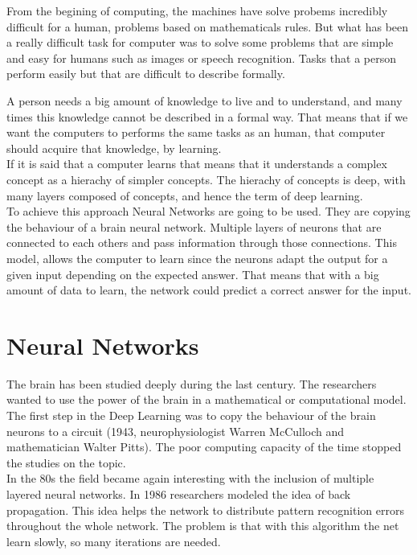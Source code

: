 From the begining of computing, the machines have solve probems incredibly difficult for a human, problems based on mathematicals rules. But what has been a really difficult task for computer was to solve some problems that are simple and easy for humans such as images or speech recognition. Tasks that a person perform easily but that are difficult to describe formally.

A person needs a big amount of knowledge to live and to understand, and many times this knowledge cannot be described in a formal way. That means that if we want the computers to performs the same tasks as an human, that computer should acquire that knowledge, by learning.\\

If it is said that a computer learns that means that it understands a complex concept as a hierachy of simpler concepts. The hierachy of concepts is deep, with many layers composed of concepts, and hence the term of deep learning.\\

To achieve this approach Neural Networks are going to be used. They are copying the behaviour of a brain neural network. Multiple layers of neurons that are connected to each others and pass information through those connections. This model, allows the computer to learn since the neurons adapt the output for a given input depending on the expected answer. That means that with a big amount of data to learn, the network could predict a correct answer for the input. \cite{deepbook}

\chapter{Neural Networks}
The brain has been studied deeply during the last century. The researchers wanted to use the power of the brain in a mathematical or computational model. The first step in the Deep Learning was to copy the behaviour of the brain neurons to a circuit (1943, neurophysiologist Warren McCulloch and mathematician Walter Pitts). The poor computing capacity of the time stopped the studies on the topic.\\

In the 80s the field became again interesting with the inclusion of multiple layered neural networks. In 1986 researchers modeled the idea of back propagation. This idea helps the network to distribute pattern recognition errors throughout the whole network. The problem is that with this algorithm the net learn slowly, so many iterations are needed. \\

